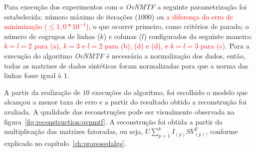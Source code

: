 \documentclass[
    12pt,                %
    oneside,            %
    a4paper,            %
    english,            %
    brazil                %
    ]{abntex2ppgsi}
\begin{document}

Para execução dos experimentos com o \textit{OvNMTF} a seguinte parametrização foi estabelecida: número máximo de iterações ($1000$) ou \textcolor{red}{a diferença do erro de minimização ($\leq 1,0*10^{-4}$)}, o que ocorrer primeiro, como critérios de parada; o número de cogrupos de linhas ($k$) e colunas ($l$) configurados da seguinte maneira: \textcolor{red}{$k = l = 2$ para (a), $k = 3$ e $l = 2 $ para (b), (d) e (d), e $k = l = 3$ para (c)}. Para a execução do algoritmo \textit{OvNMTF} é necessária a normalização dos dados, então, todas as matrizes de dados sintéticas foram normalizadas para que a norma das linhas fosse igual à $1$. 



A partir da realização de $10$ execuções do algoritmo, foi escolhido o modelo que alcançou a menor taxa de erro e a partir do resultado obtido a reconstrução foi avaliada. A qualidade das reconstruções pode ser visualmente observada na figura~\ref{fig:reconstruction:ovnmtf}. A reconstrução foi obtida a partir da multiplicação das matrizes fatoradas, ou seja, $U \sum_{p=1}^{k} I_{(p)} S V_{(p)}^T$, conforme explicado no capítulo~\ref{ch:proposedalgs}.
\end{document}
